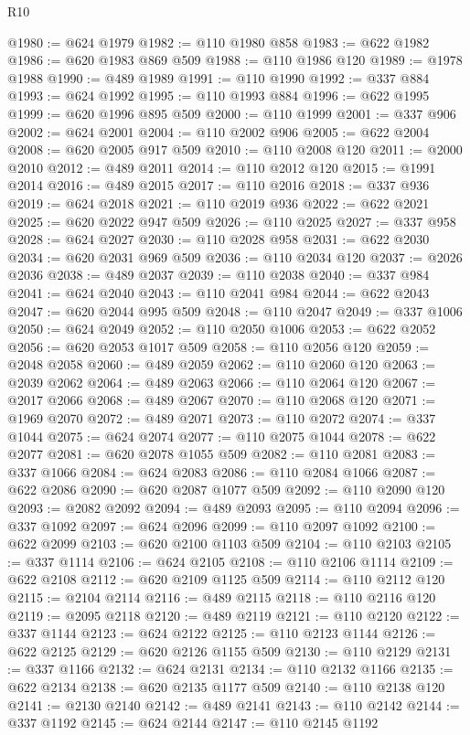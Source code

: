 \begin{lexlean}{R10}
\begin{coremodule}
@1980 := @624 @1979
@1982 := @110 @1980 @858
@1983 := @622 @1982
@1986 := @620 @1983 @869 @509
@1988 := @110 @1986 @120
@1989 := @1978 @1988
@1990 := @489 @1989
@1991 := @110 @1990
@1992 := @337 @884
@1993 := @624 @1992
@1995 := @110 @1993 @884
@1996 := @622 @1995
@1999 := @620 @1996 @895 @509
@2000 := @110 @1999
@2001 := @337 @906
@2002 := @624 @2001
@2004 := @110 @2002 @906
@2005 := @622 @2004
@2008 := @620 @2005 @917 @509
@2010 := @110 @2008 @120
@2011 := @2000 @2010
@2012 := @489 @2011
@2014 := @110 @2012 @120
@2015 := @1991 @2014
@2016 := @489 @2015
@2017 := @110 @2016
@2018 := @337 @936
@2019 := @624 @2018
@2021 := @110 @2019 @936
@2022 := @622 @2021
@2025 := @620 @2022 @947 @509
@2026 := @110 @2025
@2027 := @337 @958
@2028 := @624 @2027
@2030 := @110 @2028 @958
@2031 := @622 @2030
@2034 := @620 @2031 @969 @509
@2036 := @110 @2034 @120
@2037 := @2026 @2036
@2038 := @489 @2037
@2039 := @110 @2038
@2040 := @337 @984
@2041 := @624 @2040
@2043 := @110 @2041 @984
@2044 := @622 @2043
@2047 := @620 @2044 @995 @509
@2048 := @110 @2047
@2049 := @337 @1006
@2050 := @624 @2049
@2052 := @110 @2050 @1006
@2053 := @622 @2052
@2056 := @620 @2053 @1017 @509
@2058 := @110 @2056 @120
@2059 := @2048 @2058
@2060 := @489 @2059
@2062 := @110 @2060 @120
@2063 := @2039 @2062
@2064 := @489 @2063
@2066 := @110 @2064 @120
@2067 := @2017 @2066
@2068 := @489 @2067
@2070 := @110 @2068 @120
@2071 := @1969 @2070
@2072 := @489 @2071
@2073 := @110 @2072
@2074 := @337 @1044
@2075 := @624 @2074
@2077 := @110 @2075 @1044
@2078 := @622 @2077
@2081 := @620 @2078 @1055 @509
@2082 := @110 @2081
@2083 := @337 @1066
@2084 := @624 @2083
@2086 := @110 @2084 @1066
@2087 := @622 @2086
@2090 := @620 @2087 @1077 @509
@2092 := @110 @2090 @120
@2093 := @2082 @2092
@2094 := @489 @2093
@2095 := @110 @2094
@2096 := @337 @1092
@2097 := @624 @2096
@2099 := @110 @2097 @1092
@2100 := @622 @2099
@2103 := @620 @2100 @1103 @509
@2104 := @110 @2103
@2105 := @337 @1114
@2106 := @624 @2105
@2108 := @110 @2106 @1114
@2109 := @622 @2108
@2112 := @620 @2109 @1125 @509
@2114 := @110 @2112 @120
@2115 := @2104 @2114
@2116 := @489 @2115
@2118 := @110 @2116 @120
@2119 := @2095 @2118
@2120 := @489 @2119
@2121 := @110 @2120
@2122 := @337 @1144
@2123 := @624 @2122
@2125 := @110 @2123 @1144
@2126 := @622 @2125
@2129 := @620 @2126 @1155 @509
@2130 := @110 @2129
@2131 := @337 @1166
@2132 := @624 @2131
@2134 := @110 @2132 @1166
@2135 := @622 @2134
@2138 := @620 @2135 @1177 @509
@2140 := @110 @2138 @120
@2141 := @2130 @2140
@2142 := @489 @2141
@2143 := @110 @2142
@2144 := @337 @1192
@2145 := @624 @2144
@2147 := @110 @2145 @1192

\end{coremodule}
\end{lexlean}
